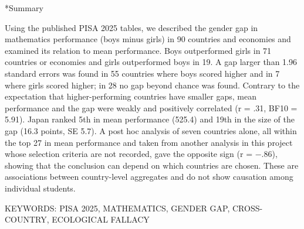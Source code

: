 \documentclass[a4paper,10pt,twocolumn]{ltjsarticle}
\makeatletter
\renewcommand{\section}{\@startsection{section}{1}{\z@}{1.1\Cvs \@plus.4\Cdp \@minus.2\Cdp}{.5\Cvs \@plus.2\Cdp}{\normalfont\gtfamily\bfseries\large}}
\makeatother
\begin{document}
\section*{Summary}
{\footnotesize\setlength{\parindent}{0pt}Using the published PISA 2025 tables, we described the gender gap in mathematics performance (boys minus girls) in 90 countries and economies and examined its relation to mean performance. Boys outperformed girls in 71 countries or economies and girls outperformed boys in 19. A gap larger than 1.96 standard errors was found in 55 countries where boys scored higher and in 7 where girls scored higher; in 28 no gap beyond chance was found. Contrary to the expectation that higher-performing countries have smaller gaps, mean performance and the gap were weakly and positively correlated (r = .31, BF10 = 5.91). Japan ranked 5th in mean performance (525.4) and 19th in the size of the gap (16.3 points, SE 5.7). A post hoc analysis of seven countries alone, all within the top 27 in mean performance and taken from another analysis in this project whose selection criteria are not recorded, gave the opposite sign (r = −.86), showing that the conclusion can depend on which countries are chosen. These are associations between country-level aggregates and do not show causation among individual students.\par\smallskip KEYWORDS: PISA 2025, MATHEMATICS, GENDER GAP, CROSS-COUNTRY, ECOLOGICAL FALLACY\par}
\medskip\noindent{}
\end{document}
